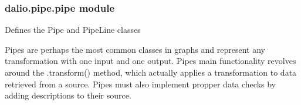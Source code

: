 \documentclass[letterpaper,10pt,english]{sphinxmanual}
\begin{document}
\subsubsection{dalio.pipe.pipe module}
\label{\detokenize{dalio.pipe:module-dalio.pipe.pipe}}\label{\detokenize{dalio.pipe:dalio-pipe-pipe-module}}
Defines the Pipe and PipeLine classes

Pipes are perhaps the most common classes in graphs and represent any
transformation with one input and one output. Pipes\textasciigrave{} main functionality
revolves around the .transform() method, which actually applies a
transformation to data retrieved from a source. Pipes must also implement
propper data checks by adding descriptions to their source.
\end{document}
